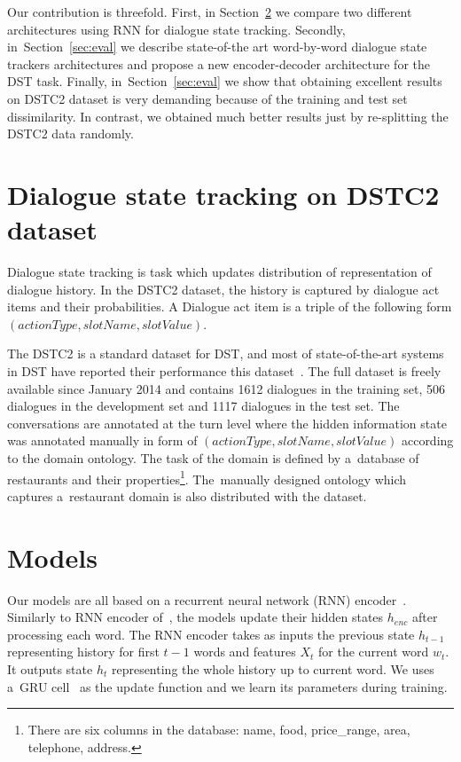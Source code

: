\documentclass{itatnew}
\def\OD#1{{\color{darkgreen}OD: \it #1}}
\begin{document}
Our contribution is threefold. 
First, in Section~\ref{sec:model} we compare two different architectures using RNN for dialogue state tracking.
Secondly, in~Section~\ref{sec:eval} we describe state-of-the art word-by-word dialogue state trackers architectures and propose a new encoder-decoder architecture for the DST task.
Finally, in~Section~\ref{sec:eval} we show that obtaining excellent results on DSTC2 dataset is very demanding because of the training and test set dissimilarity. In contrast, we obtained much better results just by re-splitting the DSTC2 data randomly.

\section{Dialogue state tracking on DSTC2 dataset}
Dialogue state tracking is task which updates distribution of representation of dialogue history.
In the DSTC2 dataset, the history is captured by dialogue act items and their probabilities.
A Dialogue act item is a triple of the following form $(actionType, slotName, slotValue)$.

The DSTC2 is a standard dataset for DST, and most of state-of-the-art systems in DST have reported their performance this dataset~\cite{henderson2014second}. 
The full dataset is freely available since January 2014 and contains 1612 dialogues in the training set, 506 dialogues in the development set and 1117 dialogues in the test set.
The conversations are annotated at the turn level where the hidden information state was annotated manually in form of $(actionType, slotName, slotValue)$ according to the domain ontology.
The task of the domain is defined by a~database of restaurants and their properties\footnote{There are six columns in the database: name, food, price\_range, area, telephone, address.}.
The~manually designed ontology which captures a~restaurant domain is also distributed with the dataset.

\section{Models}
\label{sec:model}

Our models are all based on a recurrent neural network (RNN) encoder~\cite{werbos1990backpropagation}. Similarly to RNN encoder of~\cite{zilka2015incremental}, the models update their hidden states $h_{enc}$ after processing each word. The RNN encoder takes as inputs the previous state $h_{t-1}$ representing history for first $t-1$ words and features $X_t$ for the current word $w_t$. It outputs state $h_t$ representing the whole history up to current word.
We uses a~GRU cell~\cite{cho2014gru} as the update function and we learn its parameters during training.
\end{document}
